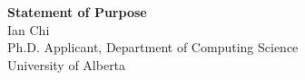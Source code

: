 \documentclass[11pt]{article}
\begin{document}
\begin{center}
    {\Large \textbf{Statement of Purpose}}\\[4pt]
    {\large Ian Chi}\\[2pt]
    Ph.D. Applicant, Department of Computing Science\\
    University of Alberta
\end{center}

\vspace{1em}

\end{document}

